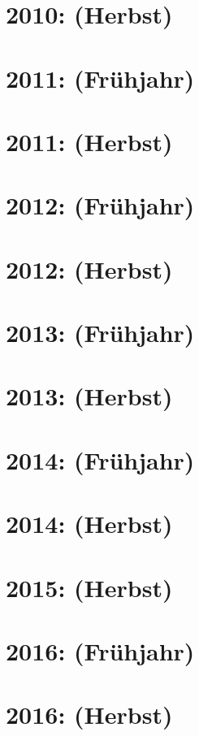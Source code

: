 \documentclass{lehramt-informatik-haupt}
\begin{document}
\section{2010: (Herbst)}


\section{2011: (Frühjahr)}


\section{2011: (Herbst)}


\section{2012: (Frühjahr)}


\section{2012: (Herbst)}


\section{2013: (Frühjahr)}


\section{2013: (Herbst)}


\section{2014: (Frühjahr)}


\section{2014: (Herbst)}


\section{2015: (Herbst)}


\section{2016: (Frühjahr)}


\section{2016: (Herbst)}

\end{document}
